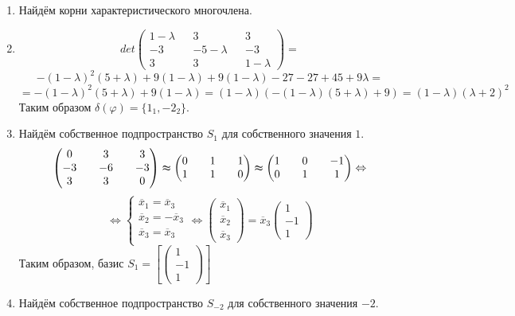 \documentclass[a4paper]{article}
\begin{document}
	\begin{enumerate}
		\item Найдём корни характеристического многочлена.
			\item 	$$det\begin{pmatrix} 1-\lambda && 3 && 3 \\ -3 && -5-\lambda && -3 \\ 3 && 3 && 1-\lambda\end{pmatrix}=$$$$-(1-\lambda)^2(5+\lambda) + 9(1-\lambda)+9(1-\lambda)-27-27+45+9\lambda=$$
			$$=-(1-\lambda)^2(5+\lambda)+9(1-\lambda)=(1-\lambda)(-(1-\lambda)(5+\lambda)+9)=(1-\lambda)(\lambda+2)^2$$
		Таким образом $\delta(\varphi)=\{1_1, -2_2\}$.
		\item Найдём собственное подпространство $S_1$ для собственного значения $1$.
		$$\begin{pmatrix} 0 && 3 && 3 \\ -3 && -6 && -3 \\ 3 && 3 && 0\end{pmatrix}\thickapprox\begin{pmatrix} 0 && 1 && 1 \\ 1 && 1 && 0\end{pmatrix}\thickapprox\begin{pmatrix} 1 && 0 && -1 \\ 0 && 1 && 1\end{pmatrix}\Leftrightarrow$$
		$$\Leftrightarrow\begin{cases}
			\overline{x}_1 = \overline{x}_3\\
			\overline{x}_2 = -\overline{x}_3\\
			\overline{x}_3 = \overline{x}_3\\
		\end{cases}\Leftrightarrow
		\begin{pmatrix} \overline{x}_1 \\ \overline{x}_2 \\ \overline{x}_3 \end{pmatrix}=
		\overline{x}_3\begin{pmatrix} 1 \\ -1 \\ 1 \end{pmatrix}$$
		Таким образом, базис $S_1=[\begin{pmatrix} 1 \\ -1 \\ 1 \end{pmatrix}]$
		\item Найдём собственное подпространство $S_{-2}$ для собственного значения $-2$.

\end{enumerate}
\end{document}
